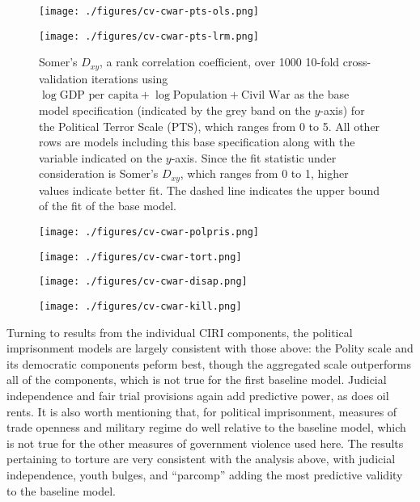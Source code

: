 \documentclass[12pt]{article}
\begin{document}
\begin{figure}[!htpb]
\centering
\texttt{[image: ./figures/cv-cwar-pts-ols.png]}
\caption{}
\label{cv-cwar-pts-ols}
\end{figure}

\begin{figure}[!htpb]
\centering
\texttt{[image: ./figures/cv-cwar-pts-lrm.png]}
\caption{Somer's $D_{xy}$, a rank correlation coefficient, over 1000 10-fold cross-validation iterations using $\log \text{GDP per capita} + \log \text{Population} + \text{Civil War}$ as the base model specification (indicated by the grey band on the $y$-axis) for the Political Terror Scale (PTS), which ranges from 0 to 5. All other rows are models including this base specification along with the variable indicated on the $y$-axis. Since the fit statistic under consideration is Somer's $D_{xy}$, which ranges from 0 to 1, higher values indicate better fit. The dashed line indicates the upper bound of the fit of the base model.}
\caption{}
\label{cv-cwar-pts-lrm}
\end{figure}

\begin{figure}[!htpb]
\centering
\texttt{[image: ./figures/cv-cwar-polpris.png]}
\caption{}
\label{cv-cwar-polpris}
\end{figure}

\begin{figure}[!htpb]
\centering
\texttt{[image: ./figures/cv-cwar-tort.png]}
\caption{}
\end{figure}

\begin{figure}[!htpb]
\centering
\texttt{[image: ./figures/cv-cwar-disap.png]}
\caption{}
\label{cv-cwar-disap}
\end{figure}

\begin{figure}[!htpb]
\centering
\texttt{[image: ./figures/cv-cwar-kill.png]}
\caption{}
\label{cv-cwar-kill}
\end{figure}

Turning to results from the individual CIRI components, the political imprisonment models are largely consistent with those above: the Polity scale and its democratic components peform best, though the aggregated scale outperforms all of the components, which is not true for the first baseline model. Judicial independence and fair trial provisions again add predictive power, as does oil rents. It is also worth mentioning that, for political imprisonment, measures of trade openness and military regime do well relative to the baseline model, which is not true for the other measures of government violence used here. The results pertaining to torture are very consistent with the analysis above, with judicial independence, youth bulges, and ``parcomp'' adding the most predictive validity to the baseline model. 
\end{document}
